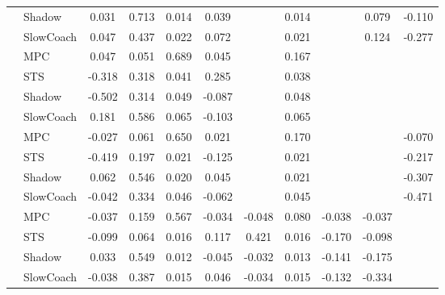 \begin{tabular}{|l|l|*{9}{c|}}
                                                           & Shadow &    0.031 &     0.713 &     0.014 &  0.039 &     &  0.014 &      &   0.079 &   -0.110 \\
                                                           & SlowCoach &    0.047 &     0.437 &     0.022 &  0.072 &     &  0.021 &      &   0.124 &   -0.277 \\
\midrule
[True, True, True, True, False, True, False, False, False] & MPC &    0.047 &     0.051 &     0.689 &  0.045 &     &  0.167 &      &      &       \\
                                                           & STS &   -0.318 &     0.318 &     0.041 &  0.285 &     &  0.038 &      &      &       \\
                                                           & Shadow &   -0.502 &     0.314 &     0.049 & -0.087 &     &  0.048 &      &      &       \\
                                                           & SlowCoach &    0.181 &     0.586 &     0.065 & -0.103 &     &  0.065 &      &      &       \\
\midrule
[True, True, True, True, False, True, False, False, True] & MPC &   -0.027 &     0.061 &     0.650 &  0.021 &     &  0.170 &      &      &   -0.070 \\
                                                           & STS &   -0.419 &     0.197 &     0.021 & -0.125 &     &  0.021 &      &      &   -0.217 \\
                                                           & Shadow &    0.062 &     0.546 &     0.020 &  0.045 &     &  0.021 &      &      &   -0.307 \\
                                                           & SlowCoach &   -0.042 &     0.334 &     0.046 & -0.062 &     &  0.045 &      &      &   -0.471 \\
\midrule
[True, True, True, True, True, True, True, True, False] & MPC &   -0.037 &     0.159 &     0.567 & -0.034 & -0.048 &  0.080 &  -0.038 &  -0.037 &       \\
                                                           & STS &   -0.099 &     0.064 &     0.016 &  0.117 &  0.421 &  0.016 &  -0.170 &  -0.098 &       \\
                                                           & Shadow &    0.033 &     0.549 &     0.012 & -0.045 & -0.032 &  0.013 &  -0.141 &  -0.175 &       \\
                                                           & SlowCoach &   -0.038 &     0.387 &     0.015 &  0.046 & -0.034 &  0.015 &  -0.132 &  -0.334 &       \\

\end{tabular}
